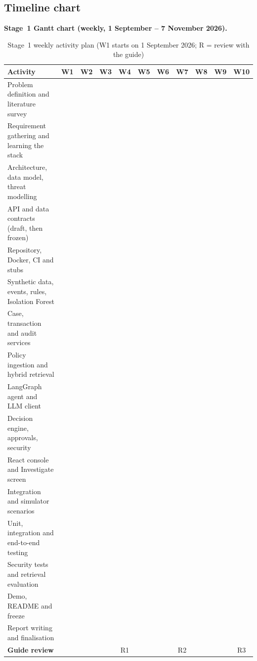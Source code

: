 \documentclass[oneside,a4paper,12pt]{report}
\begin{document}
\subsection{Timeline chart}
\textbf{Stage~1 Gantt chart (weekly, 1 September -- 7 November 2026).}
\newcommand{\gc}{\cellcolor{blue!35}}
\begin{table}[H]
\centering\footnotesize
\setlength{\tabcolsep}{2.5pt}
\begin{tabular}{|p{5.0cm}|*{10}{c|}}
\hline
\textbf{Activity} & W1 & W2 & W3 & W4 & W5 & W6 & W7 & W8 & W9 & W10 \\ \hline
Problem definition and literature survey & \gc & \gc & & & & & & & & \\ \hline
Requirement gathering and learning the stack & \gc & \gc & \gc & & & & & & & \\ \hline
Architecture, data model, threat modelling & & & \gc & \gc & & & & & & \\ \hline
API and data contracts (draft, then frozen) & & & & \gc & \gc & & & & & \\ \hline
Repository, Docker, CI and stubs & & & & & \gc & & & & & \\ \hline
Synthetic data, events, rules, Isolation Forest & & & & & \gc & \gc & \gc & & & \\ \hline
Case, transaction and audit services & & & & & & \gc & \gc & & & \\ \hline
Policy ingestion and hybrid retrieval & & & & & \gc & \gc & \gc & \gc & & \\ \hline
LangGraph agent and LLM client & & & & & & \gc & \gc & \gc & & \\ \hline
Decision engine, approvals, security & & & & & & \gc & \gc & \gc & & \\ \hline
React console and Investigate screen & & & & & & \gc & \gc & \gc & & \\ \hline
Integration and simulator scenarios & & & & & & & & \gc & \gc & \\ \hline
Unit, integration and end-to-end testing & & & & & & \gc & \gc & \gc & \gc & \\ \hline
Security tests and retrieval evaluation & & & & & & & & & \gc & \\ \hline
Demo, README and freeze & & & & & & & & & \gc & \gc \\ \hline
Report writing and finalisation & \gc & \gc & \gc & \gc & \gc & \gc & \gc & \gc & \gc & \gc \\ \hline
\textbf{Guide review} & & & & R1 & & & R2 & & & R3 \\ \hline
\end{tabular}
\caption{Stage~1 weekly activity plan (W1 starts on 1 September 2026; R = review with the guide)}
\end{table}
\end{document}
